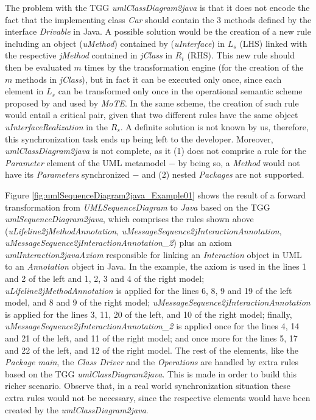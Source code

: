 \documentclass[tuberlin,cic,tc,english,noabntcite,oneside]{iiufrgs}
\begin{document}
The problem with the TGG \emph{umlClassDiagram2java} is that it does not encode the fact that the implementing class \emph{Car} should contain the $3$ methods defined by the interface \emph{Drivable} in Java. A possible solution would be the creation of a new rule including an object (\emph{uMethod}) contained by (\emph{uInterface}) in $L_s$ (LHS) linked with the respective \emph{jMethod} contained in \emph{jClass} in $R_t$ (RHS). This new rule should then be evaluated $m$ times by the transformation engine (for the creation of the $m$ methods in \emph{jClass}), but in fact it can be executed only once, since each element in $L_s$ can be transformed only once in the operational semantic scheme proposed by \citet[p. 9]{giese2010toward} and used by \emph{MoTE}. In the same scheme, the creation of such rule would entail a critical pair, given that two different rules have the same object \emph{uInterfaceRealization} in the $R_s$. A definite solution is not known by us, therefore, this synchronization task ends up being left to the developer. Moreover, \emph{umlClassDiagram2java} is not complete, as it (1) does not comprise a rule for the \emph{Parameter} element of the UML metamodel $-$ by being so, a \emph{Method} would not have its \emph{Parameters} synchronized $-$ and (2) nested \emph{Packages} are not supported.

Figure \ref{fig:umlSequenceDiagram2java_Example01} shows the result of a forward transformation from \emph{UMLSequenceDiagram} to \emph{Java} based on the TGG \emph{umlSequenceDiagram2java}, which comprises the rules shown above (\emph{uLifeline2jMethodAnnotation}, \emph{uMessageSequence2jInteractionAnnotation}, \emph{uMessageSequence2jInteractionAnnotation\_2}) plus an axiom \emph{umlInteraction2javaAxiom} responsible for linking an \emph{Interaction} object in UML to an \emph{Annotation} object in Java. In the example, the axiom is used in the lines 1 and 2 of the left and 1, 2, 3 and 4 of the right model; \emph{uLifeline2jMethodAnnotation} is applied for the lines 6, 8, 9 and 19 of the left model, and 8 and 9 of the right model;  \emph{uMessageSequence2jInteractionAnnotation} is applied for the lines 3, 11, 20 of the left, and 10 of the right model; finally, \emph{uMessageSequence2jInteractionAnnotation\_2} is applied once for the lines 4, 14 and 21 of the left, and 11 of the right model; and once more for the lines 5, 17 and 22 of the left, and 12 of the right model. The rest of the elements, like the \emph{Package main}, the \emph{Class Driver} and the \emph{Operations} are handled by extra rules based on the TGG \emph{umlClassDiagram2java}. This is made in order to build this richer scenario. Observe that, in a real world synchronization situation these extra rules would not be necessary, since the respective elements would have been created by the \emph{umlClassDiagram2java}.
\end{document}
